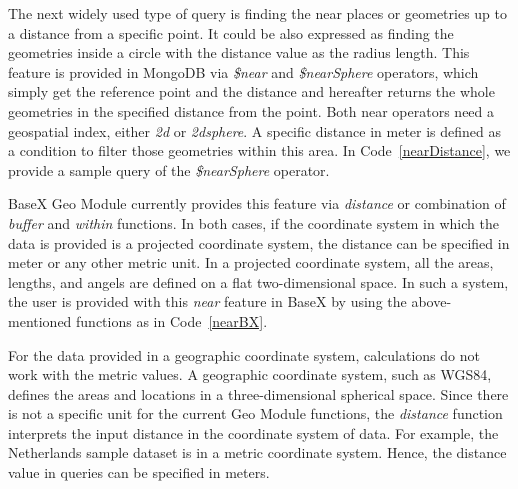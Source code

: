 \documentclass[a4paper,12pt]{article}
\begin{document}
The next widely used type of query is finding the near places or geometries up to a distance from a specific point. It could be also expressed as finding the geometries inside a circle with the distance value as the radius length. This feature is provided in MongoDB via \textit{\$near} and \textit{\$nearSphere} operators, which simply get the reference point and the distance and hereafter returns the whole geometries in the specified distance from the point. Both near operators need a geospatial index, either \textit{2d} or \textit{2dsphere}. A specific distance in meter is defined as a condition to filter those geometries within this area. In Code~\ref{nearDistance}, we provide a sample query of the \textit{\$nearSphere} operator.  
\vspace{10px}
\vspace{10px}
BaseX Geo Module currently provides this feature via \textit{distance} or combination of \textit{buffer} and \textit{within} functions. In both cases, if the coordinate system in which the data is provided is a projected coordinate system, the distance can be specified in meter or any other metric unit. In a projected coordinate system, all the areas, lengths, and angels are defined on a flat two-dimensional space. In such a system, the user is provided with this \textit{near} feature in BaseX by using the above-mentioned functions as in Code~\ref{nearBX}.
\vspace{10px}
\vspace{10px}


For the data provided in a geographic coordinate system, calculations do not work with the metric values. A geographic coordinate system, such as WGS84, defines the areas and locations in a three-dimensional spherical space. Since there is not a specific unit for the current Geo Module functions, the \textit{distance} function interprets the input distance in the coordinate system of data. For example, the Netherlands sample dataset is in a metric coordinate system. Hence, the distance value in queries can be specified in meters. %
\end{document}
